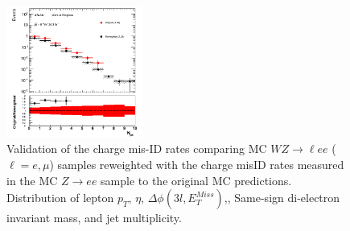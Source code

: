 \begin{figure}[htp]
 \includegraphics[width=0.4\textwidth]{figures/ChargeMisID/Validation_ChargeMisIDRates_WZ_JetMultiplicity.png}

 \caption{Validation of the charge mis-ID rates comparing MC $WZ\rightarrow \ell ee$ ($\ell=e,\mu$) samples reweighted with the charge misID rates measured in the MC $Z\to{}ee$ 
 sample to the original MC predictions. Distribution of lepton $p_{T}$, $\eta$, $\Delta \phi(3l,E_{T}^{Miss})$,\met{}, Same-sign di-electron invariant mass, and jet multiplicity.}
 \label{fig:ChargeMisID_Validation_WZ}
 \end{figure}
 
